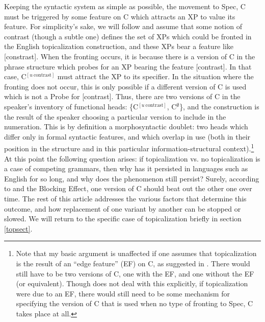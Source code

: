 Keeping the syntactic system as simple as possible, the movement to Spec, C must be triggered by some feature on C which attracts an XP to value its feature.
For simplicity's sake, we will follow \citet{caitldiss} and assume that some notion of contrast (though a subtle one) defines the set of XPs which could be fronted in the English topicalization construction, and these XPs bear a feature like [constrast].
When the fronting occurs, it is because there is a version of C in the phrase structure which probes for an XP bearing the feature [contrast].
In that case, C$^{[u~\text{contrast}]}$ must attract the XP to its specifier.
In the situation where the fronting does not occur, this is only possible if a different version of C is used which is not a Probe for [contrast].
Thus, there are two versions of C in the speaker's inventory of functional heads: \{C$^{[u~\text{contrast}]}$, C$^\emptyset$\}, and the construction is the result of the speaker choosing a particular version to include in the numeration.
This is by definition a morphosyntactic doublet: two heads which differ only in formal syntactic features, and which overlap in use (both in their position in the structure and in this particular information-structural context).\footnote{Note that my basic argument is unaffected if one assumes that topicalization is the result of an ``edge feature'' (EF) on C, as suggested in \citet[][151]{chomsky2008}.
There would still have to be two versions of C, one with the EF, and one without the EF (or equivalent).
Though \citet{chomsky2008} does not deal with this explicitly, if topicalization were due to an EF, there would still need to be some mechanism for specifying the version of C that is used when no type of fronting to Spec, C takes place at all.}
At this point the following question arises: if topicalization vs. no topicalization is a case of competing grammars, then why has it persisted in languages such as English for so long, and why does the phenomenon still persist?
Surely, according to \citet{kroch1994} and the Blocking Effect, one version of C should beat out the other one over time.
The rest of this article addresses the various factors that determine this outcome, and how replacement of one variant by another can be stopped or slowed.
We will return to the specific case of topicalization briefly in section \ref{topsect}.

